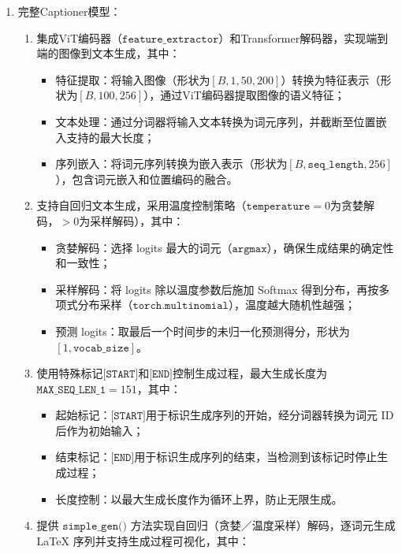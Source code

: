 \begin{enumerate}[label={（\arabic*）}, leftmargin=2em, labelsep=0.5em, itemsep=0pt]
\begin{enumerate}[label={（\alph*）}, leftmargin=2em, labelsep=0.5em, itemsep=0pt]
        \end{enumerate}
    \item 完整Captioner模型：
        \begin{enumerate}[label={（\alph*）}, leftmargin=2em, labelsep=0.5em, itemsep=0pt]
            \item 集成ViT编码器（$\texttt{feature\_extractor}$）和Transformer解码器，实现端到端的图像到文本生成，其中：
            \begin{itemize}
                \item 特征提取：将输入图像（形状为$[B, 1, 50, 200]$）转换为特征表示（形状为$[B, 100, 256]$），通过ViT编码器提取图像的语义特征；
                \item 文本处理：通过分词器将输入文本转换为词元序列，并截断至位置嵌入支持的最大长度；
                \item 序列嵌入：将词元序列转换为嵌入表示（形状为$[B, \texttt{seq\_length}, 256]$），包含词元嵌入和位置编码的融合。
            \end{itemize}
            \item 支持自回归文本生成，采用温度控制策略（$\texttt{temperature}=0$为贪婪解码，$>0$为采样解码），其中：
            \begin{itemize}
                \item 贪婪解码：选择 logits 最大的词元（$\texttt{argmax}$），确保生成结果的确定性和一致性；
                \item 采样解码：将 logits 除以温度参数后施加 Softmax 得到分布，再按多项式分布采样（$\texttt{torch.multinomial}$），温度越大随机性越强；
                \item 预测 logits：取最后一个时间步的未归一化预测得分，形状为$[1, \texttt{vocab\_size}]$。
            \end{itemize}
            \item 使用特殊标记$\texttt{[START]}$和$\texttt{[END]}$控制生成过程，最大生成长度为$\texttt{MAX\_SEQ\_LEN\_1}=151$，其中：
            \begin{itemize}
                \item 起始标记：$\texttt{[START]}$用于标识生成序列的开始，经分词器转换为词元 ID 后作为初始输入；
                \item 结束标记：$\texttt{[END]}$用于标识生成序列的结束，当检测到该标记时停止生成过程；
                \item 长度控制：以最大生成长度作为循环上界，防止无限生成。
            \end{itemize}
            \item 提供 $\texttt{simple\_gen()}$ 方法实现自回归（贪婪／温度采样）解码，逐词元生成 LaTeX 序列并支持生成过程可视化，其中：

\end{enumerate}
\end{enumerate}
